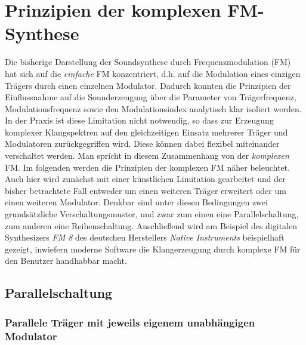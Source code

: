 \section{Prinzipien der komplexen FM-Synthese}

Die bisherige Darstellung der Soundsynthese durch Frequenzmodulation (FM) hat sich auf die \textit{einfache} FM konzentriert, d.h. auf die Modulation eines einzigen Trägers durch einen einzelnen Modulator. Dadurch konnten die Prinzipien der Einflussnahme auf die Sounderzeugung über die Parameter von Trägerfrequenz, Modulationsfrequenz sowie den Modulationsindex analytisch klar isoliert werden. In der Praxis ist diese Limitation nicht notwendig, so dass zur Erzeugung komplexer Klangspektren auf den gleichzeitigen Einsatz mehrerer Träger und Modulatoren zurückgegriffen wird. Diese können dabei flexibel miteinander verschaltet werden. Man spricht in diesem Zusammenhang von der \textit{komplexen} FM. Im folgenden werden die Prinzipien der komplexen FM näher beleuchtet. Auch hier wird zunächst mit einer künstlichen Limitation gearbeitet und der bisher betrachtete Fall entweder um einen weiteren Träger erweitert oder um einen weiteren Modulator. Denkbar sind unter diesen Bedingungen zwei grundsätzliche Verschaltungsmuster, und zwar zum einen eine Parallelschaltung, zum anderen eine Reihenschaltung. Anschließend wird am Beispiel des digitalen Synthesizers \textit{FM 8} des deutschen Herstellers \textit{Native Instruments} beispielhaft gezeigt, inwiefern moderne Software die Klangerzeugung durch komplexe FM für den Benutzer handhabbar macht. 

\subsection{Parallelschaltung}

\subsubsection{Parallele Träger mit jeweils eigenem unabhängigen Modulator}

